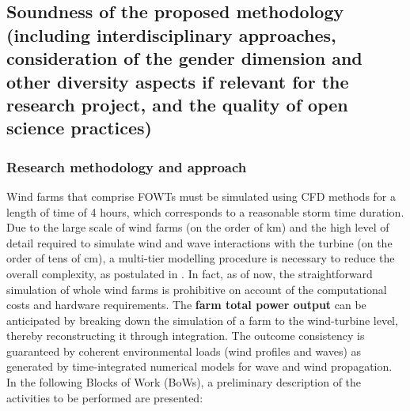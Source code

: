 


\subsection{Soundness of the proposed methodology (including interdisciplinary approaches, consideration of the gender dimension and other diversity aspects if relevant for the research project, and the quality of open science practices) }
\subsubsection*{Research methodology and approach}\vspace{-1ex}

Wind farms that comprise FOWTs must be simulated using CFD methods for a length of time of 4 hours, which corresponds to a reasonable storm time duration. Due to the large scale of wind farms (on the order of km) and the high level of detail required to simulate wind and wave interactions with the turbine (on the order of tens of cm), a multi-tier modelling procedure is necessary to reduce the overall complexity, as postulated in . In fact, as of now, the straightforward simulation of whole wind farms is prohibitive on account of the computational costs and hardware requirements. The \textbf{farm total power output} can be anticipated by breaking down the simulation of a farm to the wind-turbine level, thereby reconstructing it through integration. The outcome consistency is guaranteed by coherent environmental loads (wind profiles and waves) as generated by time-integrated numerical models for wave and wind propagation. In the following Blocks of Work (BoWs), a preliminary description of the activities to be performed are presented: 

